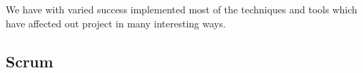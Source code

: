 We have with varied success implemented most of the techniques and tools which have affected out project in many interesting ways.

\subsection*{Scrum}